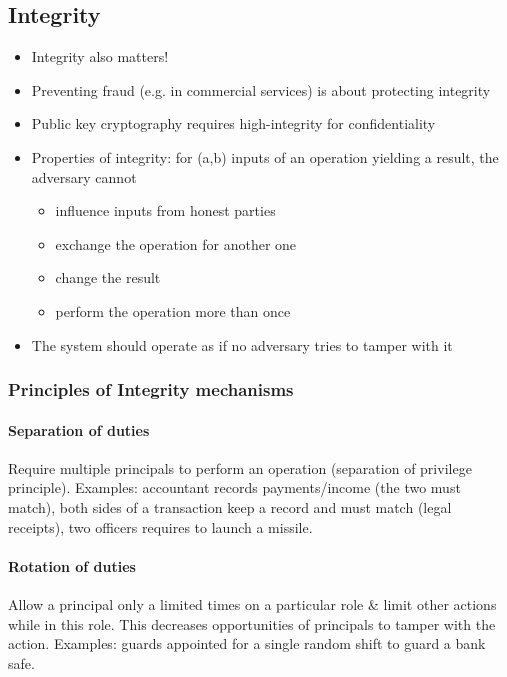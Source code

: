 \documentclass{article}
\newenvironment{myitemize}
{ \begin{itemize}
    \setlength{\itemsep}{005pt}
    \setlength{\parskip}{0pt}
    \setlength{\parsep}{0pt}     }
{ \end{itemize}                  }
\begin{document}
\begin{multicols}{2}
\begin{myitemize}
\end{myitemize}


\subsection{Integrity}

\begin{myitemize}
    \item Integrity also matters! 
    \item Preventing fraud (e.g. in commercial services) is about protecting integrity
    \item Public key cryptography requires high-integrity for confidentiality
    \item Properties of integrity: for (a,b) inputs of an operation yielding a result, the adversary cannot
    \begin{myitemize}
        \item influence inputs from honest parties
        \item exchange the operation for another one
        \item change the result
        \item perform the operation more than once
    \end{myitemize}
    \item The system should operate as if no adversary tries to tamper with it
\end{myitemize}

\subsubsection{Principles of Integrity mechanisms}

\paragraph{Separation of duties}

Require multiple principals to perform an operation (separation of privilege principle). Examples: accountant records payments/income (the two must match), both sides of a transaction keep a record and must match (legal receipts), two officers requires to launch a missile.

\paragraph{Rotation of duties} 

Allow a principal only a limited times on a particular role \& limit other actions while in this role. This decreases opportunities of principals to tamper with the action. Examples: guards appointed for a single random shift to guard a bank safe. 


\end{multicols}
\end{document}
